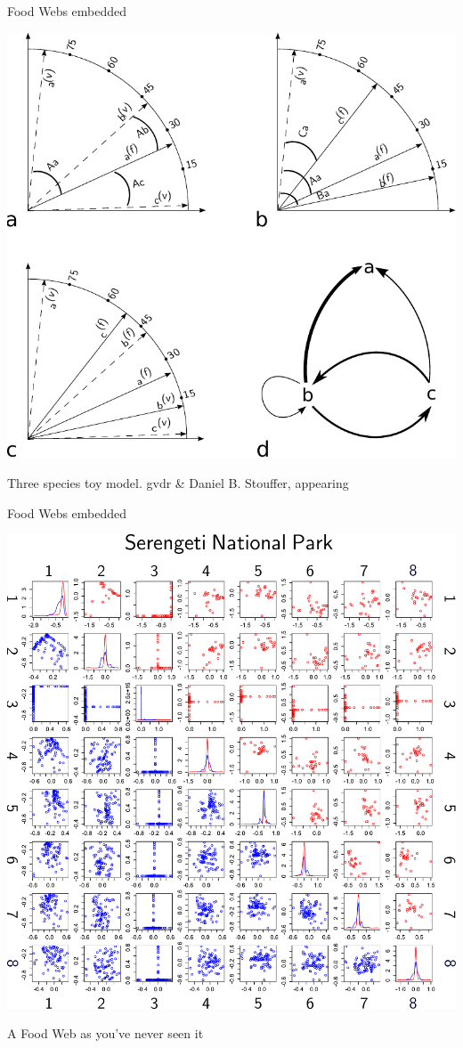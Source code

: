 \documentclass[]{beamer}
\begin{document}
\begin{frame}{Food Webs embedded}


\centering
\includegraphics[width=0.6\linewidth]{images/RDPGmodel.pdf}

\centering
{\tiny Three species toy model. gvdr \& Daniel B. Stouffer, appearing}

\end{frame}

\begin{frame}{Food Webs embedded}

\centering
  \includegraphics[width=0.6\linewidth]{images/Serengeti_scatter_8.pdf}

\centering
{\tiny A Food Web as you've never seen it}
 
\end{frame}
\end{document}
